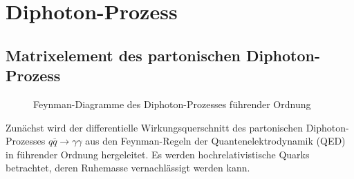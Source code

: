 \chapter{Diphoton-Prozess}
\label{2}
\section{Matrixelement des partonischen Diphoton-Prozess}
\begin{figure}
	\caption{Feynman-Diagramme des Diphoton-Prozesses führender Ordnung}
	\label{feynman-diagramme}
\end{figure}
Zunächst wird der differentielle Wirkungsquerschnitt des partonischen Diphoton-Prozesses $q\overline{q} \rightarrow \gamma \gamma$ aus den Feynman-Regeln der Quantenelektrodynamik (QED) in führender Ordnung hergeleitet. Es werden hochrelativistische Quarks betrachtet, deren Ruhemasse vernachlässigt werden kann.

